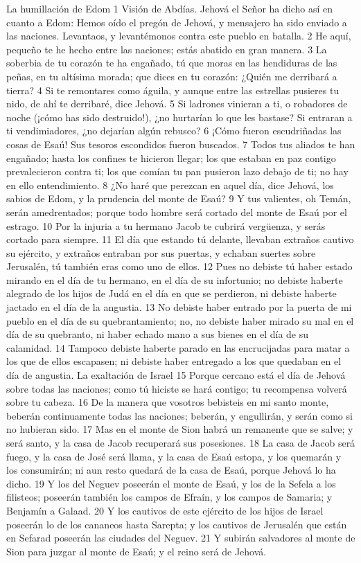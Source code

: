 

La humillación de Edom 
1 Visión de Abdías. Jehová el Señor ha dicho así en cuanto a Edom: Hemos oído el pregón de Jehová, y mensajero ha sido enviado a las naciones. Levantaos, y levantémonos contra este pueblo en batalla.  
2 He aquí, pequeño te he hecho entre las naciones; estás abatido en gran manera.  
3 La soberbia de tu corazón te ha engañado, tú que moras en las hendiduras de las peñas, en tu altísima morada; que dices en tu corazón: ¿Quién me derribará a tierra?  
4 Si te remontares como águila, y aunque entre las estrellas pusieres tu nido, de ahí te derribaré, dice Jehová.  
5 Si ladrones vinieran a ti, o robadores de noche (¡cómo has sido destruido!), ¿no hurtarían lo que les bastase? Si entraran a ti vendimiadores, ¿no dejarían algún rebusco?  
6 ¡Cómo fueron escudriñadas las cosas de Esaú! Sus tesoros escondidos fueron buscados.  
7 Todos tus aliados te han engañado; hasta los confines te hicieron llegar; los que estaban en paz contigo prevalecieron contra ti; los que comían tu pan pusieron lazo debajo de ti; no hay en ello entendimiento.  
8 ¿No haré que perezcan en aquel día, dice Jehová, los sabios de Edom, y la prudencia del monte de Esaú?  
9 Y tus valientes, oh Temán, serán amedrentados; porque todo hombre será cortado del monte de Esaú por el estrago.  
10 Por la injuria a tu hermano Jacob te cubrirá vergüenza, y serás cortado para siempre.  
11 El día que estando tú delante, llevaban extraños cautivo su ejército, y extraños entraban por sus puertas, y echaban suertes sobre Jerusalén, tú también eras como uno de ellos.  
12 Pues no debiste tú haber estado mirando en el día de tu hermano, en el día de su infortunio; no debiste haberte alegrado de los hijos de Judá en el día en que se perdieron, ni debiste haberte jactado en el día de la angustia.  
13 No debiste haber entrado por la puerta de mi pueblo en el día de su quebrantamiento; no, no debiste haber mirado su mal en el día de su quebranto, ni haber echado mano a sus bienes en el día de su calamidad.  
14 Tampoco debiste haberte parado en las encrucijadas para matar a los que de ellos escapasen; ni debiste haber entregado a los que quedaban en el día de angustia.  
La exaltación de Israel  
15 Porque cercano está el día de Jehová sobre todas las naciones; como tú hiciste se hará contigo; tu recompensa volverá sobre tu cabeza.  
16 De la manera que vosotros bebisteis en mi santo monte, beberán continuamente todas las naciones; beberán, y engullirán, y serán como si no hubieran sido.  
17 Mas en el monte de Sion habrá un remanente que se salve; y será santo, y la casa de Jacob recuperará sus posesiones.  
18 La casa de Jacob será fuego, y la casa de José será llama, y la casa de Esaú estopa, y los quemarán y los consumirán; ni aun resto quedará de la casa de Esaú, porque Jehová lo ha dicho.  
19 Y los del Neguev poseerán el monte de Esaú, y los de la Sefela a los filisteos; poseerán también los campos de Efraín, y los campos de Samaria; y Benjamín a Galaad.  
20 Y los cautivos de este ejército de los hijos de Israel poseerán lo de los cananeos hasta Sarepta; y los cautivos de Jerusalén que están en Sefarad poseerán las ciudades del Neguev.  
21 Y subirán salvadores al monte de Sion para juzgar al monte de Esaú; y el reino será de Jehová.

